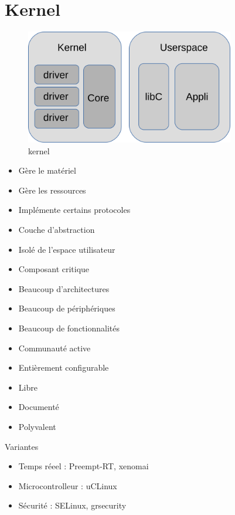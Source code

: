 \section{Kernel}
\begin{frame}
	\begin{minipage}[t]{0.45\linewidth}
		\begin{figure}
			\includegraphics[height=5cm]{img/arch_linux_full.png}
			 \caption{kernel}
		\end{figure}
	\end{minipage}
	\begin{minipage}[t]{0.45\linewidth}
		\begin{itemize}
			\item Gère le matériel
			\item Gère les ressources
			\item Implémente certains protocoles
			\item Couche d'abstraction
			\item Isolé de l'espace utilisateur
			\item Composant critique
		\end{itemize}
	\end{minipage}

\end{frame}
\begin{frame}
	\begin{itemize}
		\item Beaucoup d'architectures
		\item Beaucoup de périphériques
		\item Beaucoup de fonctionnalités
		\item Communauté active
		\item Entièrement configurable
		\item Libre
		\item Documenté
		\item Polyvalent
	\end{itemize}
	\begin{block}{Variantes}
		\begin{itemize}
			\item Temps réeel : Preempt-RT, xenomai
			\item Microcontrolleur : uCLinux
			\item Sécurité : SELinux, grsecurity
		\end{itemize}
	\end{block}
\end{frame}
